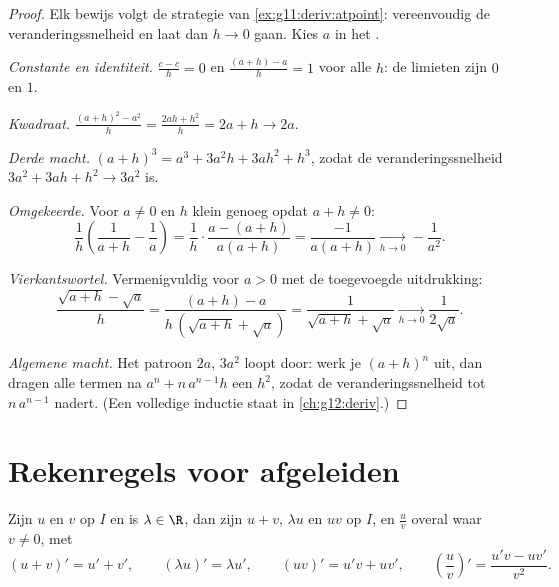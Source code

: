 \begin{proof}
Elk bewijs volgt de strategie van \cref{ex:g11:deriv:atpoint}: vereenvoudig
de veranderingssnelheid en laat dan $h \to 0$ gaan. Kies $a$ in het .

\emph{Constante en identiteit.} $\frac{c - c}{h} = 0$ en
$\frac{(a+h) - a}{h} = 1$ voor alle $h$: de limieten zijn $0$ en $1$.

\emph{Kwadraat.} $\frac{(a+h)^2 - a^2}{h} = \frac{2ah + h^2}{h} = 2a + h
\to 2a$.

\emph{Derde macht.} $(a+h)^3 = a^3 + 3a^2h + 3ah^2 + h^3$, zodat de
veranderingssnelheid $3a^2 + 3ah + h^2 \to 3a^2$ is.

\emph{Omgekeerde.} Voor $a \neq 0$ en $h$ klein genoeg opdat $a + h \neq 0$:
\[
\frac{1}{h}\left(\frac{1}{a+h} - \frac{1}{a}\right)
= \frac{1}{h} \cdot \frac{a - (a+h)}{a(a+h)}
= \frac{-1}{a(a+h)}
\xrightarrow[h \to 0]{} -\frac{1}{a^2}.
\]

\emph{Vierkantswortel.} Vermenigvuldig voor $a > 0$ met de toegevoegde
uitdrukking:
\[
\frac{\sqrt{a+h} - \sqrt a}{h}
= \frac{(a + h) - a}{h\,(\sqrt{a+h} + \sqrt a)}
= \frac{1}{\sqrt{a+h} + \sqrt a}
\xrightarrow[h \to 0]{} \frac{1}{2\sqrt a}.
\]

\emph{Algemene macht.} Het patroon $2a$, $3a^2$ loopt door: werk je
$(a+h)^n$ uit, dan dragen alle termen na $a^n + n\,a^{n-1}h$ een $h^2$,
zodat de veranderingssnelheid tot $n\,a^{n-1}$ nadert. (Een volledige
inductie staat in \cref{ch:g12:deriv}.)
\end{proof}

\section{Rekenregels voor afgeleiden}

\begin{theorem}[Bewerkingen]\label{thm:g11:deriv:rules}
Zijn $u$ en $v$  op $I$ en is $\lambda \in \R$, dan zijn
$u + v$, $\lambda u$ en $uv$  op $I$, en $\frac{u}{v}$
overal waar $v \neq 0$, met
\[
(u+v)' = u' + v', \qquad
(\lambda u)' = \lambda u', \qquad
(uv)' = u'v + uv', \qquad
\left(\frac{u}{v}\right)' = \frac{u'v - uv'}{v^2}.
\]
\end{theorem}

